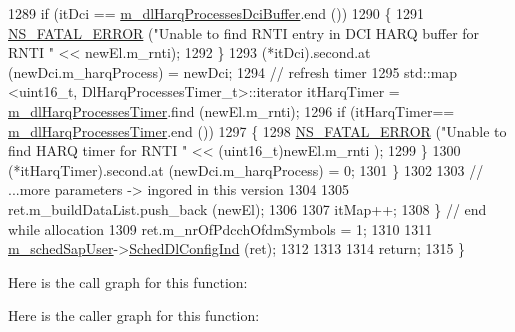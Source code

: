 \begin{DoxyCode}
1289           \textcolor{keywordflow}{if} (itDci == \hyperlink{classns3_1_1TtaFfMacScheduler_aef07d22e5c2e6acf1f711736bce49fc8}{m\_dlHarqProcessesDciBuffer}.end ())
1290             \{
1291               \hyperlink{group__fatal_ga5131d5e3f75d7d4cbfd706ac456fdc85}{NS\_FATAL\_ERROR} (\textcolor{stringliteral}{"Unable to find RNTI entry in DCI HARQ buffer for RNTI "} << 
      newEl.m\_rnti);
1292             \}
1293           (*itDci).second.at (newDci.m\_harqProcess) = newDci;
1294           \textcolor{comment}{// refresh timer}
1295           std::map <uint16\_t, DlHarqProcessesTimer\_t>::iterator itHarqTimer =  
      \hyperlink{classns3_1_1TtaFfMacScheduler_ac17ab46a13a0d51459cc7b1d7e5ebc06}{m\_dlHarqProcessesTimer}.find (newEl.m\_rnti);
1296           \textcolor{keywordflow}{if} (itHarqTimer== \hyperlink{classns3_1_1TtaFfMacScheduler_ac17ab46a13a0d51459cc7b1d7e5ebc06}{m\_dlHarqProcessesTimer}.end ())
1297             \{
1298               \hyperlink{group__fatal_ga5131d5e3f75d7d4cbfd706ac456fdc85}{NS\_FATAL\_ERROR} (\textcolor{stringliteral}{"Unable to find HARQ timer for RNTI "} << (uint16\_t)newEl.m\_rnti
      );
1299             \}
1300           (*itHarqTimer).second.at (newDci.m\_harqProcess) = 0;
1301         \}
1302 
1303       \textcolor{comment}{// ...more parameters -> ingored in this version}
1304 
1305       ret.m\_buildDataList.push\_back (newEl);
1306 
1307       itMap++;
1308     \} \textcolor{comment}{// end while allocation}
1309   ret.m\_nrOfPdcchOfdmSymbols = 1;   
1310 
1311   \hyperlink{classns3_1_1TtaFfMacScheduler_a950cb3e5f468debf1fa002171ff299f1}{m\_schedSapUser}->\hyperlink{classns3_1_1FfMacSchedSapUser_a28f8484af5a32a45ee6c0e51770d83f7}{SchedDlConfigInd} (ret);
1312 
1313 
1314   \textcolor{keywordflow}{return};
1315 \}
\end{DoxyCode}


Here is the call graph for this function\+:




Here is the caller graph for this function\+:


